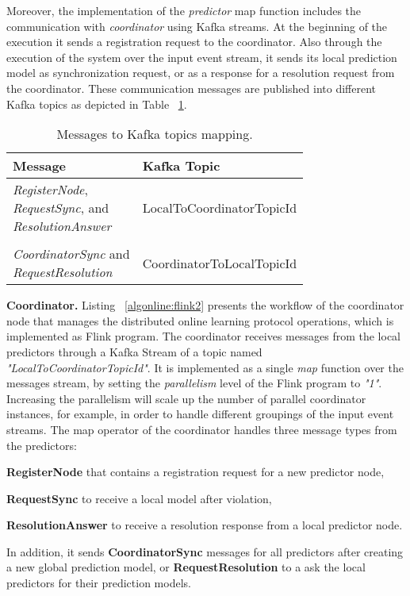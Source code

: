 \par Moreover, the implementation of  the \textit{predictor} map function includes the communication  with \textit{coordinator} using Kafka streams. At the beginning of the execution it sends a registration request to the coordinator. Also through the execution of the system over the input event stream,  it sends  its local prediction model as synchronization request,  or as a response for a resolution request from the coordinator. These communication messages are published into different Kafka topics as depicted in Table ~\ref{tab:messagesToTopics}. 

\begin{table}[h]
	\caption{Messages to Kafka topics mapping.}
	\label{tab:messagesToTopics}
	\begin{tabular}{p{3cm}l}
		\toprule
		Message &Kafka Topic\\
		\midrule
		\parbox[t]{4cm}{\textit{RegisterNode}, \\ \textit{RequestSync}, and \\\textit{ResolutionAnswer} } &LocalToCoordinatorTopicId\\ \\
		
			  \parbox[t]{4cm}{\textit{CoordinatorSync} and \\ \textit{RequestResolution}} &CoordinatorToLocalTopicId\\
		\bottomrule
	\end{tabular}
\end{table}


\textbf{Coordinator.} Listing ~\ref{algonline:flink2} presents the workflow of the coordinator node that manages the distributed online learning protocol operations, which is implemented as Flink program. The coordinator receives messages from the local predictors through a Kafka Stream of a topic named \textit{"LocalToCoordinatorTopicId"}. It is implemented as a single \textit{map} function over the messages stream, by setting the \textit{parallelism} level of the Flink program to \textit{"1"}. Increasing the parallelism will scale up the number of parallel coordinator instances, for example, in order to handle different groupings of the input event streams. The map operator of the coordinator  handles three message types from the predictors: \begin{enumerate*}[(i)]
	\item \textbf{RegisterNode} that contains  a registration request for a new predictor node,
	\item \textbf{RequestSync} to receive a local model after violation,
	\item \textbf{ResolutionAnswer} to receive a resolution response from a local predictor node.  
\end{enumerate*}  
 In addition, it sends \textbf{CoordinatorSync} messages for all predictors after creating a new global prediction model, or \textbf{RequestResolution} to a ask the local predictors for their prediction models.
 

